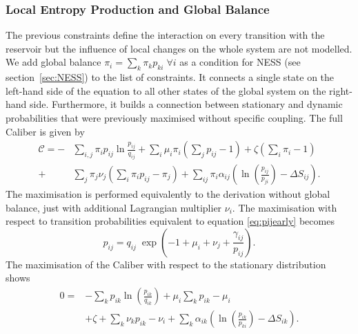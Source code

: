 \subsubsection{Local Entropy Production and Global Balance}
The previous constraints define the interaction on every transition with the reservoir but the influence of local changes on the whole system are not modelled. We add global balance $\pi_i = \sum_k \pi_k p_{ki} \; \forall i$ as a condition for NESS (see section~\ref{sec:NESS}) to the list of constraints. It connects a single state on the left-hand side of the equation to all other states of the global system on the right-hand side. Furthermore, it builds a connection between stationary and dynamic probabilities that were previously maximised without specific coupling. The full Caliber is given by
  \begin{equation}
    \begin{aligned}
      \mathcal{C} = -&\sum_{i,j} \pi_i p_{ij}\ln \frac{p_{ij}}{q_{ij}} 
      +   \sum_i \mu_i \pi_i \left( \sum_j p_{ij} - 1 \right) + \zeta ( \sum_i \pi_i -1) \\
      +&  \sum_j \pi_j \nu_j \left(\sum_i \pi_i p_{ij} - \pi_j \right) 
      + \sum_{ij} \pi_i  \alpha_{ij} \left( \ln \left( 
\frac{p_{ij}}{p_{ji}} \right) - \Delta S_{ij} \right).
    \end{aligned}
  \end{equation}
The maximisation is performed equivalently to the derivation without global balance, just with additional Lagrangian multiplier $\nu_i$. The maximisation with respect to transition probabilities equivalent to equation \ref{eq:pijearly} becomes
  \begin{equation}
  p_{ij} = q_{ij} \; \exp \left ( -1 + \mu_i + \nu_j + \frac{ \gamma_{ij} 
}{p_{ij}} \right ).
  \label{eq:pij}
  \end{equation}
The maximisation of the Caliber with respect to the stationary distribution 
shows
  \begin{equation}
    \begin{aligned}
      0 =& -\sum_k p_{ik} \ln \left ( \frac{p_{ik}}{q_{ik}}  \right ) + \mu_i 
\sum_k p_{ik} - \mu_i \\& +\zeta + \sum_k \nu_k p_{ik} - \nu_i 
      + \sum_{k} \alpha_{ik} \left( \ln \left ( \frac{p_{ik}}{p_{ki}} 
\right) - \Delta S_{ik}  \right  ) .
    \end{aligned}
  \end{equation}
